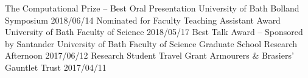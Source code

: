 \begin{cvpubs}
  \cvpub
    {The Computational Prize -- Best Oral Presentation}
    {University of Bath Bolland Symposium}
    {2018/06/14}
  \cvpub
    {Nominated for Faculty Teaching Assistant Award}
    {University of Bath Faculty of Science}
    {2018/05/17}
  \cvpub
    {Best Talk Award -- Sponsored by Santander}
    {University of Bath Faculty of Science Graduate School Research Afternoon}
    {2017/06/12}
  \cvpub
  	{Research Student Travel Grant}
    {Armourers \& Brasiers' Gauntlet Trust}
    {2017/04/11}
\end{cvpubs}



